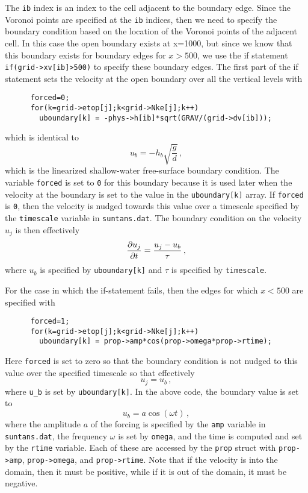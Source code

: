 \documentclass[12pt,oneside]{article}
\begin{document}
The \verb+ib+ index is an index to the cell adjacent to the boundary edge.  Since the Voronoi points
are specified at the \verb+ib+ indices, then we need to specify the boundary condition based on
the location of the Voronoi points of the adjacent cell.  In this case the open boundary exists at x=1000, but since
we know that this boundary exists for boundary edges for $x>500$, we use the if statement
\verb+if(grid->xv[ib]>500)+ to specify these boundary edges.  The first part of the if statement
sets the velocity at the open boundary over all the vertical levels with
\begin{verbatim}
      forced=0;
      for(k=grid->etop[j];k<grid->Nke[j];k++) 
        uboundary[k] = -phys->h[ib]*sqrt(GRAV/(grid->dv[ib]));
\end{verbatim}
which is identical to 
\[ u_b = -h_b\sqrt{\frac{g}{d}} \,,\]
which is the linearized shallow-water free-surface boundary condition.  The variable \verb+forced+ is
set to \verb+0+ for this boundary because it is used later when the velocity at the boundary is set
to the value in the \verb+uboundary[k]+ array.  If \verb+forced+ is \verb+0+, then the velocity is nudged
towards this value over a timescale specified by the \verb+timescale+ variable in \verb+suntans.dat+.  
The boundary condition on the velocity $u_j$ is then effectively
\[\frac{\partial{u_j}}{\partial{t}} = \frac{u_j-u_b}{\tau}\,,\]
where $u_b$ is specified by \verb+uboundary[k]+ and $\tau$ is specified by \verb+timescale+.  

For the case in which the if-statement fails, then the edges for which $x<500$ are specified with
\begin{verbatim}
      forced=1;
      for(k=grid->etop[j];k<grid->Nke[j];k++) 
        uboundary[k] = prop->amp*cos(prop->omega*prop->rtime);
\end{verbatim}
Here \verb+forced+ is set to zero so that the boundary condition is not nudged to this value over
the specified timescale so that effectively
\[u_j = u_b\,,\]
where \verb+u_b+ is set by \verb+uboundary[k]+.  In the above code, the boundary value is set to
\[u_b = a\cos(\omega t)\,,\]
where the amplitude $a$ of the forcing is specified by the \verb+amp+ variable in \verb+suntans.dat+,
the frequency $\omega$ is set by \verb+omega+, and the time is computed and set by the \verb+rtime+ 
variable.  Each of these are accessed by the \verb+prop+ struct with \verb+prop->amp+, \verb+prop->omega+,
and \verb+prop->rtime+.  Note that if the velocity is into the domain, then it must be positive, while
if it is out of the domain, it must be negative.
\end{document}
